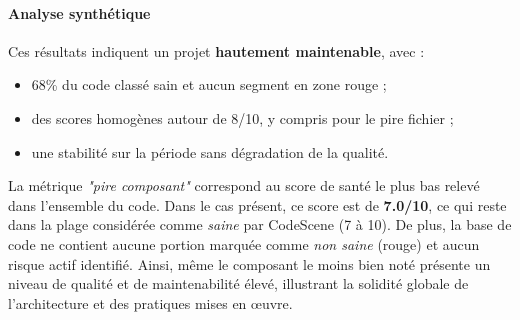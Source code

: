 \paragraph{Analyse synthétique}
Ces résultats indiquent un projet \textbf{hautement maintenable}, avec :
\begin{itemize}
    \item 68\% du code classé sain et aucun segment en zone rouge ;
    \item des scores homogènes autour de 8/10, y compris pour le pire fichier ;
    \item une stabilité sur la période sans dégradation de la qualité.
\end{itemize}

La métrique \textit{"pire composant"} correspond au score de santé le plus bas relevé dans l’ensemble du code.
Dans le cas présent, ce score est de \textbf{7.0/10}, ce qui reste dans la plage considérée comme \textit{saine} par CodeScene (7 à 10).
De plus, la base de code ne contient aucune portion marquée comme \textit{non saine} (rouge) et aucun risque actif identifié.
Ainsi, même le composant le moins bien noté présente un niveau de qualité et de maintenabilité élevé, illustrant la solidité globale de l’architecture et des pratiques mises en œuvre.
